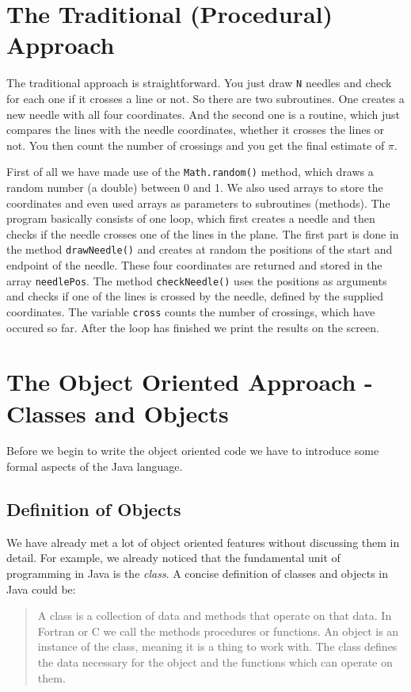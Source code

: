 \section{The Traditional (Procedural) Approach}
The traditional approach is straightforward. You just
draw \verb|N| needles and check for each one if it crosses a
line or not. So there are two subroutines. One creates a new
needle with all four coordinates. And the second one is a 
routine, which just compares the lines with the needle coordinates,
whether it crosses the lines or not. You then count the number
of crossings and you get the final estimate of $\pi$.

First of all we have made use of the \verb|Math.random()| method, which
draws a random number (a double) between 0 and 1. We also used arrays
to store the coordinates and even used arrays as parameters to
subroutines (methods). The program basically consists of one loop,
which first creates a needle and then checks if the needle crosses
one of the lines in the plane. The first part is done in the method
\verb|drawNeedle()| and creates at random the positions of the start 
and endpoint of the needle. These four coordinates are returned and
stored in the array \verb|needlePos|. The method \verb|checkNeedle()|
uses the positions as arguments and checks if one of the lines is
crossed by the needle, defined by the supplied coordinates.
The variable \verb|cross| counts the number of crossings, which
have occured so far. After the loop has finished we print the
results on the screen.

\section{The Object Oriented Approach - Classes and Objects}
\label{sec:Classes_and_Objects}
Before we begin to write the object oriented code 
we have to introduce some formal aspects of the Java language.

\subsection{Definition of Objects}
We have already met a lot of object oriented features 
without discussing them in detail.  For example, we already noticed
that the fundamental unit of programming in Java is the {\em class}. A
concise definition of classes and objects in Java could be:
\begin{quote}
A class is a collection of data and methods that operate on that data. In
Fortran or C we call the methods procedures or functions. An object
is an instance of the class, meaning it is a thing to work with. The class
defines the data necessary for the object and the functions which can
operate on them.   
\end{quote}

